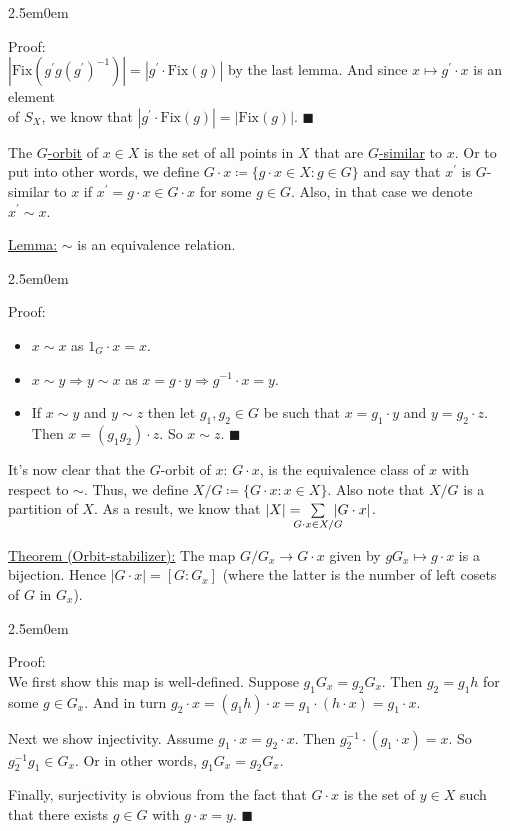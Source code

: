 \documentclass{book}
\newcommand{\hTwo}{%
\color{Black}%
   \fontsize{13}{15}\selectfont%
}
\newcommand{\exTwo}{%
   \color{Purple}%
   \fontsize{13}{15}\selectfont%
}
\newcommand{\exThreeP}{%
   \color{RedViolet}%
   \fontsize{12}{14}\selectfont%
}
\newenvironment{myIndent}{%
   \begin{adjustwidth}{2.5em}{0em}%
}{%
   \end{adjustwidth}%
}
\newcommand{\udefine}[1]{{%
   \setulcolor{Red}%
   \setul{0.14em}{0.07em}%
   \ul{#1}%
}}
\newcommand{\Fix}{\mathrm{Fix}}
\newcommand{\retTwo}{\hfill\bigbreak}
\begin{document}
\begin{myIndent}\exThreeP
	Proof:\\
	$|\Fix(g^\prime g (g^\prime)^{-1})| = |g^\prime \cdot \Fix(g)|$ by the last lemma. And since $x \mapsto g^\prime \cdot x$ is an element\\ of $S_X$, we know that $|g^\prime \cdot \Fix(g)| = |\Fix(g)|$. $\blacksquare$\retTwo
\end{myIndent}

\hTwo The \udefine{$G$-orbit} of $x \in X$ is the set of all points in $X$ that are \udefine{$G$-similar} to $x$. Or to put into other words, we define $G \cdot x \coloneqq \{g \cdot x \in X : g \in G\}$ and say that $x^\prime$ is $G$-similar to $x$ if $x^\prime = g \cdot x \in G \cdot x$ for some $g \in G$. Also, in that case we denote $x^\prime \sim x$.\retTwo

\exTwo\ul{Lemma:} $\sim$ is an equivalence relation.
\begin{myIndent}\exThreeP
	Proof:\\ [-20pt]
	\begin{itemize}
		\item $x \sim x$ as $1_G \cdot x = x$.
		\item $x \sim y \Longrightarrow y \sim x$ as $x = g \cdot y \Longrightarrow g^{-1} \cdot x = y$.
		\item If $x \sim y$ and $y \sim z$ then let $g_1, g_2 \in G$ be such that $x = g_1 \cdot y$ and $y = g_2 \cdot z$. Then $x = (g_1g_2) \cdot z$. So $x \sim z$. $\blacksquare$\retTwo
	\end{itemize}
\end{myIndent}

\hTwo It's now clear that the $G$-orbit of $x$: $G \cdot x$, is the equivalence class of $x$ with respect to $\sim$. Thus, we define $X/G \coloneqq \{G \cdot x : x \in X\}$. Also note that $X/G$ is a partition of $X$. As a result, we know that $|X| = \hspace{-0.8em}\sum\limits_{G \cdot x \in X/G}\hspace{-0.8em} |G \cdot x|$.\retTwo

\exTwo\ul{Theorem (Orbit-stabilizer):} The map $G/G_x \to G \cdot x$ given by $gG_x \mapsto g \cdot x$ is a bijection. Hence $|G \cdot x| = [G : G_x]$ (where the latter is the number of left cosets of $G$ in $G_x$).
\begin{myIndent}\exThreeP
	Proof:\\
	We first show this map is well-defined. Suppose $g_1G_x = g_2G_x$. Then $g_2 = g_1h$ for some $g \in G_x$. And in turn $g_2 \cdot x = (g_1h) \cdot x = g_1 \cdot (h \cdot x) = g_1 \cdot x$.\retTwo

	Next we show injectivity. Assume $g_1 \cdot x = g_2 \cdot x$. Then $g_2^{-1} \cdot (g_1 \cdot x) = x$. So $g_2^{-1}g_1 \in G_x$. Or in other words, $g_1G_x = g_2G_x$.\retTwo

	Finally, surjectivity is obvious from the fact that $G \cdot x$ is the set of $y \in X$ such that there exists $g \in G$ with $g \cdot x = y$. $\blacksquare$\newpage
\end{myIndent}
\end{document}
